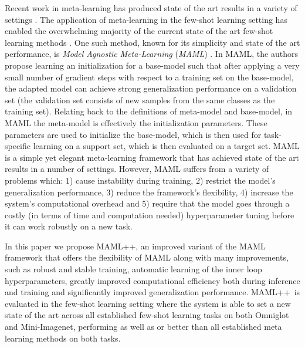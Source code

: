 \documentclass{article} \usepackage[dvipsnames]{xcolor}
\newcommand{\newmaml}{MAML++}
\begin{document}
Recent work in meta-learning has produced state of the art results in a variety of settings \citep{wangmlrl2016,ba2016using,zoph2016neural,andrychowicz2016learning, vinyals2016matching, li2016learning,li2017meta, antoniou2017data,brock2017smash,munkhdalai2017meta}. The application of meta-learning in the few-shot learning setting has enabled the overwhelming majority of the current state of the art few-shot learning methods \citep{vinyals2016matching,ravi2016optimization,edwards2016towards,finn2017model,li2017meta,munkhdalai2017meta}. One such method, known for its simplicity and state of the art performance, is \emph{Model Agnostic Meta-Learning} (\emph{MAML}) \citep{finn2017model}. In MAML, the authors propose learning an initialization for a base-model such that after applying a very small number of gradient steps with respect to a training set on the base-model, the adapted model can achieve strong generalization performance on a validation set (the validation set consists of new samples from the same classes as the training set). Relating back to the definitions of meta-model and base-model, in MAML the meta-model is effectively the initialization parameters. These parameters are used to initialize the base-model, which is then used for task-specific learning on a support set, which is then evaluated on a target set. MAML is a simple yet elegant meta-learning framework that has achieved state of the art results in a number of settings. However, MAML suffers from a variety of problems which: 1) cause instability during training, 2) restrict the model's generalization performance, 3) reduce the framework's flexibility, 4) increase the system's computational overhead and 5) require that the model goes through a costly (in terms of time and computation needed) hyperparameter tuning before it can work robustly on a new task. 



















In this paper we propose \newmaml, an improved variant of the MAML framework that offers the flexibility of MAML along with many improvements, such as robust and stable training, automatic learning of the inner loop hyperparameters, greatly improved computational efficiency both during inference and training and significantly improved generalization performance. \newmaml\ is evaluated in the few-shot learning setting where the system is able to set a new state of the art across all established few-shot learning tasks on both Omniglot and Mini-Imagenet, performing as well as or better than all established meta learning methods on both tasks.
\end{document}
